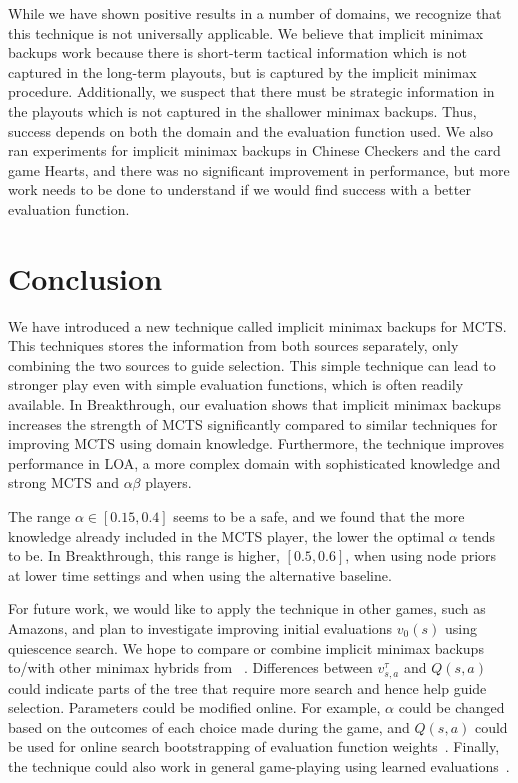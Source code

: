 \documentclass{article}
\begin{document}
While we have shown positive results in a number of domains, we recognize that this 
technique is not universally applicable. We believe that implicit minimax backups work because there is short-term tactical 
information which 
is not captured in the long-term playouts, but is captured by the implicit minimax procedure. Additionally, we suspect that 
there must be strategic 
information in the playouts which is not captured in the shallower minimax backups. Thus, success depends on both the domain and 
the evaluation function used. 
We also ran experiments for implicit minimax backups in Chinese Checkers and the card game Hearts, 
and there was no significant improvement in performance,  
but more work needs to be done to understand if we would find success with a better evaluation function.

\section{Conclusion}

We have introduced a new technique called implicit minimax backups for MCTS. 
This techniques stores the information from both sources separately, only combining the
two sources to guide selection. This simple technique can lead to stronger play even with
simple evaluation functions, which is often readily available. 
In Breakthrough, our evaluation shows that implicit minimax backups increases 
the strength of MCTS significantly compared to similar techniques for improving MCTS
using domain knowledge. Furthermore, the technique improves 
performance in LOA, a more complex domain with sophisticated knowledge and 
strong MCTS and $\alpha \beta$ players. 

The range $\alpha \in [0.15,0.4]$ seems to be a safe, and we found 
that the more knowledge already included in the MCTS player, the lower
the optimal $\alpha$ tends to be. In Breakthrough, this range is higher, $[0.5,0.6]$, 
when using node priors at lower time settings and when using the alternative baseline. 

For future work, we would like to apply the technique in other games, such as Amazons, 
and plan to investigate improving initial evaluations $v_0(s)$ using quiescence search.
We hope to compare or combine implicit minimax backups to/with other 
minimax hybrids from ~\cite{Baier13MinimaxHybrids}. 
Differences between $v^{\tau}_{s,a}$ and $Q(s,a)$ could indicate parts of the tree that require 
more search and hence help guide selection. 
Parameters could be modified online. For example, $\alpha$ could be changed based on the outcomes
of each choice made during the game, and $Q(s,a)$ could be used for online search 
bootstrapping of evaluation function weights~\cite{Veness09Bootstrapping}.
Finally, the technique could also work in general game-playing using learned
evaluations~\cite{Finnsson10Learning}. \\
\end{document}
